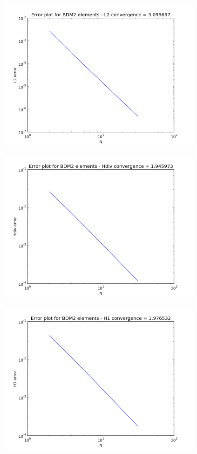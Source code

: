 \documentclass[12pt]{extarticle}
\numberwithin{equation}{section}    %
\begin{document}
\begin{figure}[h!]
\centering
\includegraphics[width=10cm]{Plots/BDML2}
\end{figure}

\begin{figure}[h!]
\centering
\includegraphics[width=10cm]{Plots/BDMHdiv}
\end{figure}

\begin{figure}[h!]
\centering
\includegraphics[width=10cm]{Plots/BDMH1}
\end{figure}
\end{document}
